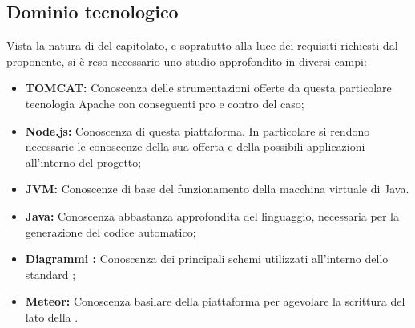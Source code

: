   \subsection{Dominio tecnologico}
    Vista la natura di  del capitolato, e sopratutto alla luce dei requisiti richiesti dal proponente, si è reso necessario uno studio approfondito in diversi campi:
      \begin{itemize}
        \item \textbf{ TOMCAT:}  Conoscenza delle strumentazioni offerte da questa particolare tecnologia Apache con conseguenti pro e contro del caso;
        \item \textbf{Node.js:} Conoscenza di questa piattaforma. In particolare si rendono necessarie le conoscenze della sua offerta e della possibili applicazioni
        all'interno del progetto;
        \item \textbf{JVM:} Conoscenze di base del funzionamento della macchina virtuale di Java.
        \item \textbf{Java:} Conoscenza abbastanza approfondita del linguaggio, necessaria per la generazione del codice automatico;
        \item \textbf{Diagrammi :} Conoscenza dei principali schemi utilizzati all'interno dello standard ;
        \item \textbf{Meteor:} Conoscenza basilare della piattaforma per agevolare la scrittura del lato  della .
      \end{itemize}
